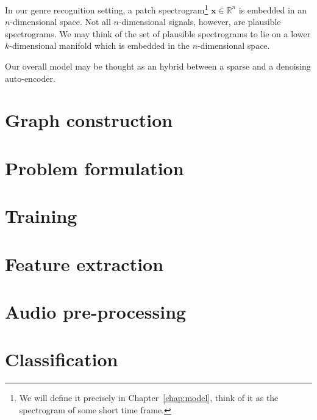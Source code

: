 \documentclass[a4paper,12pt,twoside]{report}
\newcommand{\chapref}[1]{Chapter~\ref{#1}}
\newcommand{\R}{\mathbb{R}}
\newcommand{\x}{\mathbf{x}}
\begin{document}

In our genre recognition setting, a patch spectrogram\footnote{We will define it precisely in \chapref{chap:model}, think of it as the spectrogram of some short time frame.} $\x \in \R^n$ is embedded in an $n$-dimensional space. Not all $n$-dimensional signals, however, are plausible spectrograms. We may think of the set of plausible spectrograms to lie on a lower $k$-dimensional manifold which is embedded in the $n$-dimensional space.

Our overall model may be thought as an hybrid between a sparse and a denoising auto-encoder.

\section{Graph construction}

\section{Problem formulation}

\section{Training}

\section{Feature extraction}

\section{Audio pre-processing}

\section{Classification}
\end{document}
